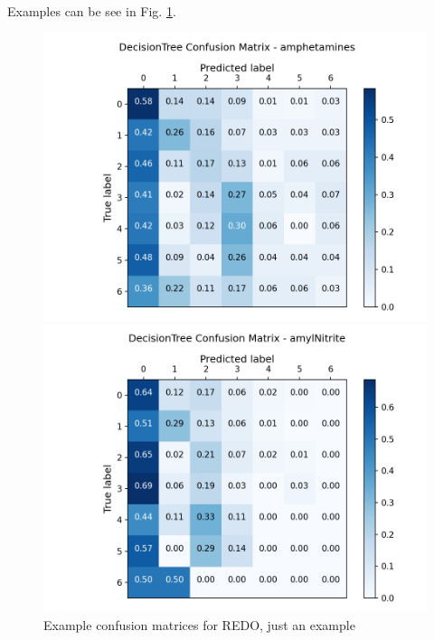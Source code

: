 \documentclass{article}
\begin{document}
Examples can be see in Fig. \ref{confusion_matrices}.





\begin{figure}[h!]
	\centering
	\begin{minipage}[b]{0.49\textwidth}
		\includegraphics[width=\textwidth]{Plots/m2.png}

	\end{minipage}
	\begin{minipage}[b]{0.49\textwidth}
		\includegraphics[width=\textwidth]{Plots/m1.png}

	\end{minipage}

	\caption{Example confusion matrices for {\color{red} REDO, just an example }  }
	\label{confusion_matrices}
\end{figure}
\end{document}
